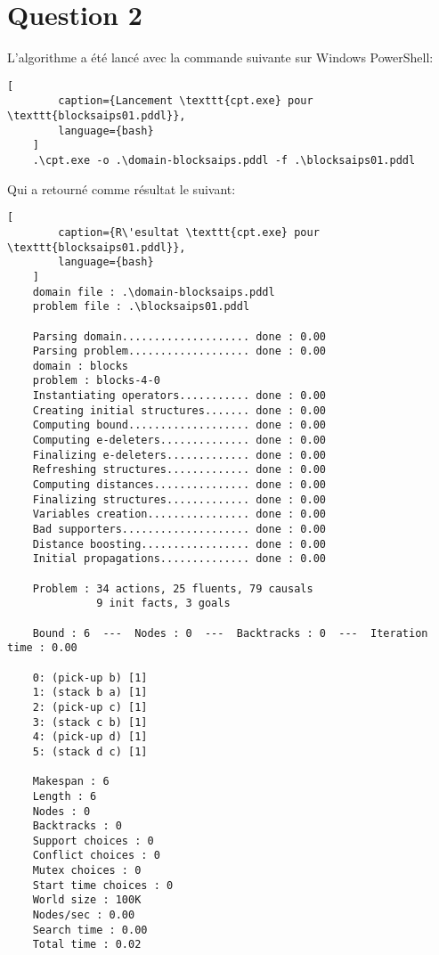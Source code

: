 \documentclass[../CSC_5RO16_TA_TP5.tex]{subfiles}
\begin{document}
\section{Question 2}
% 
\noindent L'algorithme a été lancé avec la commande suivante sur Windows PowerShell:
\begin{scriptsize}\mycode
	\begin{lstlisting}[
        caption={Lancement \texttt{cpt.exe} pour \texttt{blocksaips01.pddl}},
        language={bash}
    ]
    .\cpt.exe -o .\domain-blocksaips.pddl -f .\blocksaips01.pddl
    \end{lstlisting}
\end{scriptsize}

\noindent Qui a retourné comme résultat le suivant:

\begin{scriptsize}\mycode
	\begin{lstlisting}[
        caption={R\'esultat \texttt{cpt.exe} pour \texttt{blocksaips01.pddl}},
        language={bash}
    ]
    domain file : .\domain-blocksaips.pddl
    problem file : .\blocksaips01.pddl
    
    Parsing domain.................... done : 0.00
    Parsing problem................... done : 0.00
    domain : blocks
    problem : blocks-4-0
    Instantiating operators........... done : 0.00
    Creating initial structures....... done : 0.00
    Computing bound................... done : 0.00
    Computing e-deleters.............. done : 0.00
    Finalizing e-deleters............. done : 0.00
    Refreshing structures............. done : 0.00
    Computing distances............... done : 0.00
    Finalizing structures............. done : 0.00
    Variables creation................ done : 0.00
    Bad supporters.................... done : 0.00
    Distance boosting................. done : 0.00
    Initial propagations.............. done : 0.00
    
    Problem : 34 actions, 25 fluents, 79 causals
              9 init facts, 3 goals
    
    Bound : 6  ---  Nodes : 0  ---  Backtracks : 0  ---  Iteration time : 0.00
    
    0: (pick-up b) [1]
    1: (stack b a) [1]
    2: (pick-up c) [1]
    3: (stack c b) [1]
    4: (pick-up d) [1]
    5: (stack d c) [1]
    
    Makespan : 6
    Length : 6
    Nodes : 0
    Backtracks : 0
    Support choices : 0
    Conflict choices : 0
    Mutex choices : 0
    Start time choices : 0
    World size : 100K
    Nodes/sec : 0.00
    Search time : 0.00
    Total time : 0.02
	\end{lstlisting}
\end{scriptsize}
\end{document}
